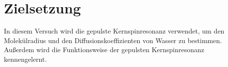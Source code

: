 \section{Zielsetzung}
\label{sec:Zielsetzung}

In diesem Versuch wird die gepulste Kernspinresonanz verwendet, um den Molekülradius und den Diffusionskoeffizienten von Wasser zu bestimmen.
Außerdem wird die Funktionsweise der gepulsten Kernspinresonanz kennengelernt.
